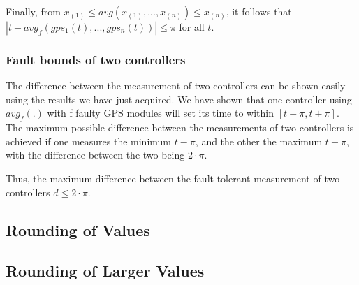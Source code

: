 \documentclass[12pt,a4paper,titlepage,oneside]{article}
\begin{document}
Finally, from $x_{(1)} \leq avg(x_{(1)}, ..., x_{(n)}) \leq x_{(n)}$, it follows
that $|t - avg_f(gps_1(t), ..., gps_n(t))| \leq \pi$ for all $t$.

\subsubsection{Fault bounds of two controllers}

The difference between the measurement of two controllers can be shown easily
using the results we have just acquired. We have shown that one controller using
$avg_f(.)$ with f faulty GPS modules will set its time to within $[t - \pi, t +
\pi]$. The maximum possible difference between the measurements of two
controllers is achieved if one measures the minimum $t - \pi$, and the other the
maximum $t + \pi$, with the difference between the two being $2 \cdot \pi$.

Thus, the maximum difference between the fault-tolerant measurement of two
controllers $d \leq 2 \cdot \pi$.

\subsection{Rounding of Values}
\subsection{Rounding of Larger Values}


\newpage
\appendix
\end{document}
